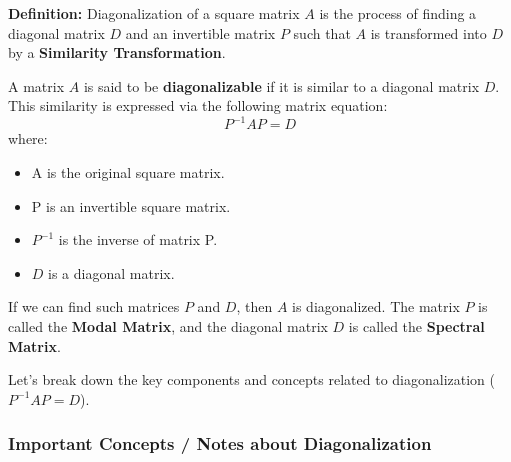 \documentclass{article}
\begin{document}
\textbf{Definition:}
Diagonalization of a square matrix $A$ is the process of finding a diagonal matrix $D$ and an invertible matrix $P$ such that $A$ is transformed into $D$ by a \textbf{Similarity Transformation}.

A matrix $A$ is said to be \textbf{diagonalizable} if it is similar to a diagonal matrix $D$. This similarity is expressed via the following matrix equation:
\[ P^{-1}AP = D \]
where:
\begin{itemize}
    \item A is the original square matrix.
    \item P is an invertible square matrix.
    \item $P^{-1}$ is the inverse of matrix P.
    \item $D$ is a diagonal matrix.
\end{itemize}
If we can find such matrices $P$ and $D$, then $A$ is diagonalized. The matrix $P$ is called the \textbf{Modal Matrix}, and the diagonal matrix $D$ is called the \textbf{Spectral Matrix}.

Let's break down the key components and concepts related to diagonalization ($P^{-1}AP = D$).

\subsubsection*{Important Concepts / Notes about Diagonalization}
\end{document}
